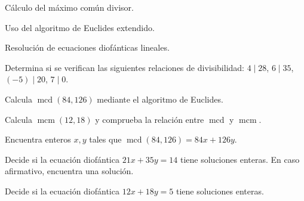 \begin{seminario}
  \item Cálculo del máximo común divisor.
  \item Uso del algoritmo de Euclides extendido.
  \item Resolución de ecuaciones diofánticas lineales.
\end{seminario}

\begin{ejerciciospropuestos}
  \item Determina si se verifican las siguientes relaciones de divisibilidad: \(4\mid 28\), \(6\mid 35\), \((-5)\mid 20\), \(7\mid 0\).
  \item Calcula \(\operatorname{mcd}(84,126)\) mediante el algoritmo de Euclides.
  \item Calcula \(\operatorname{mcm}(12,18)\) y comprueba la relación entre \(\operatorname{mcd}\) y \(\operatorname{mcm}\).
  \item Encuentra enteros \(x,y\) tales que \(\operatorname{mcd}(84,126)=84x+126y\).
  \item Decide si la ecuación diofántica \(21x+35y=14\) tiene soluciones enteras. En caso afirmativo, encuentra una solución.
  \item Decide si la ecuación diofántica \(12x+18y=5\) tiene soluciones enteras.
\end{ejerciciospropuestos}


